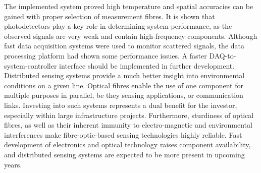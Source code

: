 \documentclass{standalone}
\begin{document}
The implemented system proved high temperature and spatial accuracies can be gained with proper selection of measurement fibres. It is shown that photodetectors play a key role in determining system performance, as the observed signals are very weak and contain high-frequency components. Although fast data acquisition systems were used to monitor scattered signals, the data processing platform had shown some performance issues. A faster DAQ-to-system-controller interface should be implemented in further development. \\

Distributed sensing systems provide a much better insight into environmental conditions on a given line. Optical fibres enable the use of one component for multiple purposes in parallel, be they sensing applications, or communication links. Investing into such systems represents a dual benefit for the investor, especially within large infrastructure projects. Furthermore, sturdiness of optical fibres, as well as their inherent immunity to electro-magnetic and environmental interferences make fibre-optic-based sensing technologies highly reliable. Fast development of electronics and optical technology raises component availability, and distributed sensing systems are expected to be more present in upcoming years.



\setcounter{stranica}{\thepage}
\addtocounter{stranica}{1}
\end{document}
